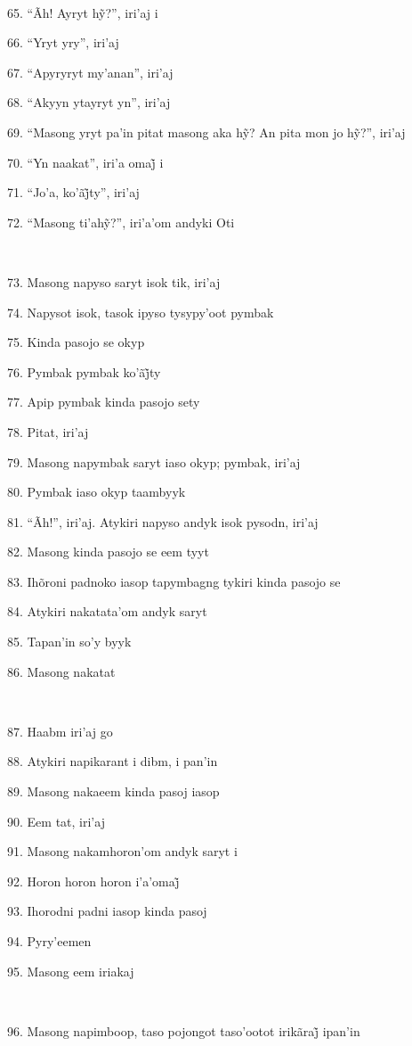 ~

65. ``Ãh! Ayryt hỹ?'', iri’aj i

66. ``Yryt yry'', iri'aj

67. ``Apyryryt my'anan'', iri'aj

68. ``Akyyn ytayryt yn'', iri'aj

69. ``Masong yryt pa’in pitat masong aka hỹ? An pita mon jo hỹ?'', iri’aj

70. ``Yn naakat'', iri’a omaj̃ i

71. ``Jo’a, ko’ãj̃ty'', iri’aj

72. ``Masong ti’ahỹ?'', iri’a’om andyki Oti

~

73. Masong napyso saryt isok tik, iri'aj

74. Napysot isok, tasok ipyso tysypy'oot pymbak

75. Kinda pasojo se okyp

76. Pymbak pymbak ko’ãj̃ty

77. Apip pymbak kinda pasojo sety

78. Pitat, iri'aj

79. Masong napymbak saryt iaso okyp; pymbak, iri'aj

80. Pymbak iaso okyp taambyyk

81. ``Ãh!'', iri'aj. Atykiri napyso andyk isok pysodn, iri'aj

82. Masong kinda pasojo se eem tyyt

83. Ihõroni padnoko iasop tapymbagng tykiri kinda pasojo se

84. Atykiri nakatata'om andyk saryt

85. Tapan'in so'y byyk

86. Masong nakatat

~

87. Haabm iri'aj go

88. Atykiri napikarant i dibm, i pan'in

89. Masong nakaeem kinda pasoj iasop

90. Eem tat, iri'aj

91. Masong nakamhoron'om andyk saryt i

92. Horon horon horon i’a’omaj̃

93. Ihorodni padni iasop kinda pasoj

94. Pyry'eemen

95. Masong eem iriakaj

~

96. Masong napimboop, taso pojongot taso’ootot irikãraj̃ ipan’in

